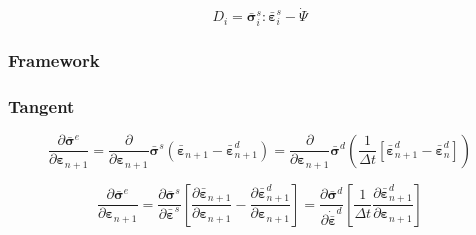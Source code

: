 \documentclass[12pt]{article}
\newcommand{\tr}{\text{tr}}
\newcommand{\pder}[2]{\dfrac{\partial #1}{\partial #2}}
\begin{document}
\begin{equation}
D_{i} = \bar{\bm{\sigma}}_{i}^{s}:\bar{\bm{\varepsilon}}_{i}^{s} - \dot{\Psi}
\end{equation}


\subsubsection{Framework}

%
%		


\subsubsection{Tangent}

\begin{equation}
	\pder{\bar{\bm{\sigma}}^{e}}{\bm{\varepsilon}_{n+1}} = \pder{}{\bm{\varepsilon}_{n+1}}\bar{\bm{\sigma}}^{s}\left(\bar{\bm{\varepsilon}}_{n+1} - \bar{\bm{\varepsilon}}^{d}_{n+1}\right) = \pder{}{\bm{\varepsilon}_{n+1}}\bar{\bm{\sigma}}^{d}\left(\dfrac{1}{\Delta t}\left[\bar{\bm{\varepsilon}}^{d}_{n+1} - \bar{\bm{\varepsilon}}^{d}_{n}\right]\right) 
\end{equation}

\begin{equation}
\pder{\bar{\bm{\sigma}}^{e}}{\bm{\varepsilon}_{n+1}} = \pder{\bar{\bm{\sigma}}^{s}}{\bar{\bm{\varepsilon}}^{s}} \left[\pder{\bar{\bm{\varepsilon}}_{n+1}}{\bm{\varepsilon}_{n+1}} - \pder{\bar{\bm{\varepsilon}}^{d}_{n+1}}{\bm{\varepsilon}_{n+1}}\right] = \pder{\bar{\bm{\sigma}}^{d}}{\dot{\bar{\bm{\varepsilon}}}^{d}} \left[\dfrac{1}{\Delta t}\pder{\bar{\bm{\varepsilon}}^{d}_{n+1}}{\bm{\varepsilon}_{n+1}} \right]
\end{equation}
\end{document}
